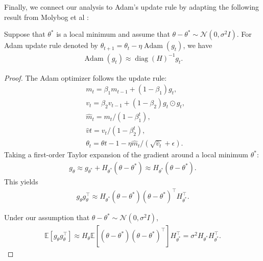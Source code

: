 Finally, we connect our analysis to Adam's update rule by adapting the following result from Molybog et al \cite{molybog2023theory}: 
\begin{proposition}
\label{prop:adam_hessian}
Suppose that $\theta^*$ is a local minimum and assume that $\theta - \theta^* \sim \mathcal{N}(0, \sigma^2 I)$. For Adam update rule denoted by $\theta_{t+1} = \theta_t - \eta \operatorname{Adam}(g_t)$, 
we have
\begin{align}
    \operatorname{Adam}(g_t) \approx \operatorname{diag}\left( H \right)^{-1} g_t.
\end{align}
\end{proposition}


\begin{proof}
The Adam optimizer follows the update rule:
\begin{align*}
&m_t = \beta_1 m_{t-1} + (1-\beta_1) g_t, \\
&v_t = \beta_2 v_{t-1} + (1-\beta_2) g_t \odot g_t ,\\
&\hat{m}_t = m_t/(1-\beta_1^t), \\
&\hat{v}t = v_t/(1-\beta_2^t), \\
&\theta_t = \theta{t-1} - \eta \hat{m}_t/(\sqrt{\hat{v}_t}+\epsilon).
\end{align*}
Taking a first-order Taylor expansion of the gradient around a local minimum $\theta^*$:
\begin{align*}
    g_\theta \approx g_{\theta^*}+   H_{\theta^*}\left(\theta-\theta^*\right) \approx    H_{\theta^*}\left( {\theta}- {\theta}^*\right).
\end{align*}
This yields
\begin{align*}
      {g}_\theta   {g}_{  {\theta}}^{\top} \approx    H_{\theta^*}\left(  {\theta}-  {\theta}^*\right)\left(  {\theta}-  {\theta}^*\right)^{\top}    H_{  {\theta}^*}^{\top}.
\end{align*}

Under our assumption that $\theta - \theta^* \sim \mathcal{N}(0, \sigma^2 I)$,
\begin{align*}
    \mathbb{E}\left[   {g}_\theta    {g}_{   {\theta}}^{\top}\right] \approx    H_{   {\theta}} \mathbb{E}\left[\left(   {\theta}-   {\theta}^*\right)\left(   {\theta}-   {\theta}^*\right)^{\top}\right]    H_{   {\theta}^*}^{\top}=\sigma^2    H_{\theta^*}    H_{   {\theta}^*}^{\top}.
\end{align*}


\end{proof}
